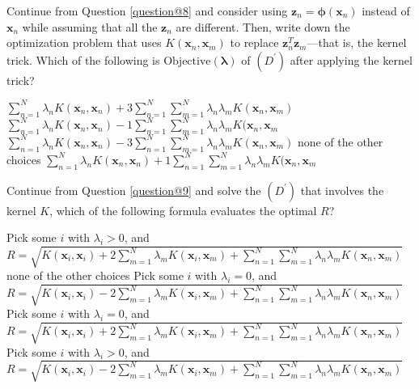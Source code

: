 \documentclass[a4paper,10pt]{exam}
\begin{document}
\begin{questions}
   \question Continue from Question \ref{question@8} and consider using $\mathbf{z}_n = {\boldsymbol\phi}(\mathbf{x}_n)$ instead of $\mathbf{x}_n$ while assuming that all the $\mathbf{z}_n$ are different. Then, write down the optimization problem that uses $K(\mathbf{x}_n, \mathbf{x}_m)$ to replace $\mathbf{z}_n^T \mathbf{z}_m$---that is, the kernel trick. Which of the following is $\mbox{Objective}(\boldsymbol\lambda)$ of $(D^\prime)$ after applying the kernel trick?
   \begin{checkboxes}
   	\choice $\sum_{n=1}^N \lambda_n K(\mathbf{x}_n, \mathbf{x}_n) + 3\sum_{n=1}^N \sum_{m=1}^N \lambda_n \lambda_m K(\mathbf{x}_n, \mathbf{x}_m)$
    \CorrectChoice $\sum_{n=1}^N \lambda_n K(\mathbf{x}_n, \mathbf{x}_n) - 1\sum_{n=1}^N \sum_{m=1}^N \lambda_n \lambda_m K(\mathbf{x}_n, \mathbf{x}_m$
    \choice $\sum_{n=1}^N \lambda_n K(\mathbf{x}_n, \mathbf{x}_n) - 3\sum_{n=1}^N \sum_{m=1}^N \lambda_n \lambda_m K(\mathbf{x}_n, \mathbf{x}_m)$
    \choice none of the other choices
    \choice $\sum_{n=1}^N \lambda_n K(\mathbf{x}_n, \mathbf{x}_n) + 1\sum_{n=1}^N \sum_{m=1}^N \lambda_n \lambda_m K(\mathbf{x}_n, \mathbf{x}_m$
   	\end{checkboxes}
   
   \question Continue from Question \ref{question@9} and solve the $(D^\prime)$ that involves the kernel $K$, which of the following formula evaluates the optimal $R$?
   
   \begin{checkboxes}
   	\choice Pick some $i$ with $\lambda_i > 0$, and $R = \sqrt{K(\mathbf{x}_i, \mathbf{x}_i) + 2 \sum_{m=1}^N \lambda_m K(\mathbf{x}_i, \mathbf{x}_m) + \sum_{n=1}^N \sum_{m=1}^N \lambda_n \lambda_m K(\mathbf{x}_n, \mathbf{x}_m)}$
   	\choice none of the other choices
   	\choice Pick some $i$ with $\lambda_i = 0$, and $R = \sqrt{K(\mathbf{x}_i, \mathbf{x}_i) - 2 \sum_{m=1}^N \lambda_m K(\mathbf{x}_i, \mathbf{x}_m) + \sum_{n=1}^N \sum_{m=1}^N \lambda_n \lambda_m K(\mathbf{x}_n, \mathbf{x}_m)}$
   	\choice Pick some $i$ with $\lambda_i = 0$, and $R = \sqrt{K(\mathbf{x}_i, \mathbf{x}_i) + 2 \sum_{m=1}^N \lambda_m K(\mathbf{x}_i, \mathbf{x}_m) + \sum_{n=1}^N \sum_{m=1}^N \lambda_n \lambda_m K(\mathbf{x}_n, \mathbf{x}_m)}$
   	\CorrectChoice Pick some $i$ with $\lambda_i > 0$, and $R = \sqrt{K(\mathbf{x}_i, \mathbf{x}_i) - 2 \sum_{m=1}^N \lambda_m K(\mathbf{x}_i, \mathbf{x}_m) + \sum_{n=1}^N \sum_{m=1}^N \lambda_n \lambda_m K(\mathbf{x}_n, \mathbf{x}_m)}$
   \end{checkboxes}
   

\end{questions}
\end{document}
